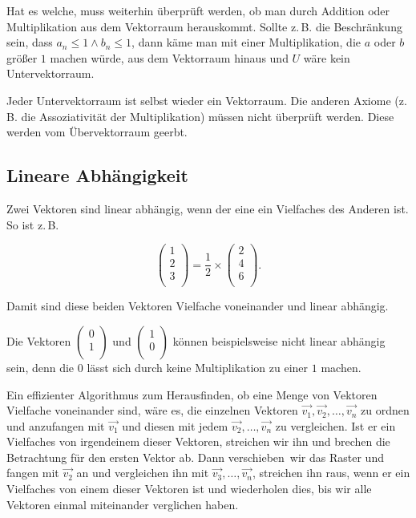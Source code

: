 \documentclass{scrartcl}
\begin{document}
Hat es welche, muss weiterhin überprüft werden, ob man durch Addition oder Multiplikation aus dem Vektorraum herauskommt. Sollte
z.\,B. die Beschränkung sein, dass $a_n \leq 1 \wedge b_n \leq 1$, dann käme man mit einer Multiplikation, die $a$ oder $b$
größer $1$ machen würde, aus dem Vektorraum hinaus und $U$ wäre kein Untervektorraum.

Jeder Untervektorraum ist selbst wieder ein Vektorraum. Die anderen Axiome (z.\,B. die Assoziativität der Multiplikation) müssen
nicht überprüft werden. Diese werden vom Übervektorraum \frq geerbt\flq.

\subsection{Lineare Abhängigkeit}

\label{lineareabhaengigkeit}

Zwei Vektoren sind linear abhängig, wenn der eine ein Vielfaches des Anderen ist. So ist z.\,B.

\begin{equation}
	\begin{pmatrix*}
		1\\
		2\\
		3\\
	\end{pmatrix*} = \frac{1}{2} \times \begin{pmatrix*}
		2\\
		4\\
		6\\
	\end{pmatrix*}.
\end{equation}

Damit sind diese beiden Vektoren Vielfache voneinander und linear abhängig.

Die Vektoren $\begin{pmatrix*}
	0\\
	1\\
\end{pmatrix*}$ und $\begin{pmatrix*}
	1\\
	0\\
\end{pmatrix*}$ können beispielsweise nicht linear abhängig sein, denn die $0$ lässt sich durch keine Multiplikation
zu einer $1$ machen.

Ein effizienter Algorithmus zum Herausfinden, ob eine Menge von Vektoren Vielfache voneinander sind, wäre es, 
die einzelnen Vektoren $\vec{v_1}, \vec{v_2}, \dots, \vec{v_n}$ zu ordnen und anzufangen mit $\vec{v_1}$ und diesen
mit jedem $\vec{v_2}, \dots, \vec{v_n}$ zu vergleichen. Ist er ein Vielfaches von irgendeinem dieser Vektoren,
streichen wir ihn und brechen die Betrachtung für den ersten Vektor ab.
Dann \frq verschieben\flq\ wir das Raster und fangen mit $\vec{v_2}$ an und vergleichen ihn mit $\vec{v_3}, \dots, \vec{v_n}$,
streichen ihn raus, wenn er ein Vielfaches von einem dieser Vektoren ist und wiederholen dies, bis wir alle Vektoren einmal
miteinander verglichen haben.
\end{document}

